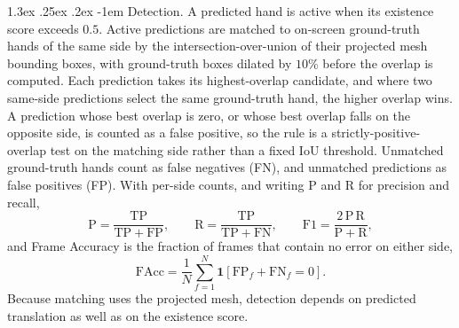 \documentclass[10pt,twocolumn,letterpaper]{article}
\makeatletter
\renewcommand\paragraph{\@startsection{paragraph}{4}{\z@}%
  {1.3ex \@plus .25ex \@minus .2ex}%
  {-1em}%
  {\normalfont\normalsize\bfseries}}
\makeatother
\begin{document}
\paragraph{Detection.} A predicted hand is active when its existence score exceeds $0.5$. Active predictions are matched to on-screen ground-truth hands of the same side by the intersection-over-union of their projected mesh bounding boxes, with ground-truth boxes dilated by $10\%$ before the overlap is computed. Each prediction takes its highest-overlap candidate, and where two same-side predictions select the same ground-truth hand, the higher overlap wins. A prediction whose best overlap is zero, or whose best overlap falls on the opposite side, is counted as a false positive, so the rule is a strictly-positive-overlap test on the matching side rather than a fixed IoU threshold. Unmatched ground-truth hands count as false negatives (FN), and unmatched predictions as false positives (FP). With per-side counts, and writing $\mathrm{P}$ and $\mathrm{R}$ for precision and recall,
\begin{equation}
\mathrm{P}=\frac{\mathrm{TP}}{\mathrm{TP}+\mathrm{FP}},\qquad
\mathrm{R}=\frac{\mathrm{TP}}{\mathrm{TP}+\mathrm{FN}},\qquad
\mathrm{F1}=\frac{2\,\mathrm{P}\,\mathrm{R}}{\mathrm{P}+\mathrm{R}},
\end{equation}
and Frame Accuracy is the fraction of frames that contain no error on either side,
\begin{equation}
\mathrm{FAcc}=\frac{1}{N}\sum_{f=1}^{N}\mathbf{1}\!\left[\mathrm{FP}_f+\mathrm{FN}_f=0\right].
\end{equation}
Because matching uses the projected mesh, detection depends on predicted translation as well as on the existence score.
\end{document}
